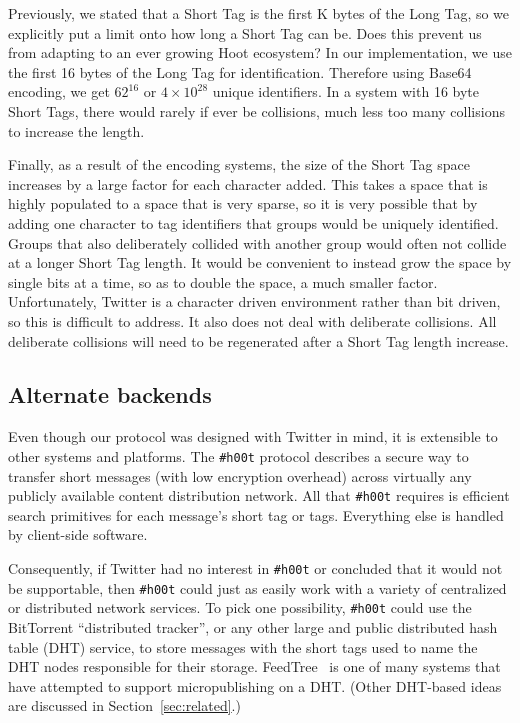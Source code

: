 \documentclass{sig-alternate-arxiv}
\newcommand{\hoot}{{\tt \#h00t}\xspace}
\begin{document}
Previously, we stated that a Short Tag is the first K bytes of the Long Tag, so we explicitly put a limit onto how long a Short Tag can be. Does this prevent us from adapting to an ever growing Hoot ecosystem? In our implementation, we use the first 16 bytes of the Long Tag for identification. Therefore using Base64 encoding, we get $62^{16}$ or $4\times10^{28}$ unique identifiers. In a system with 16 byte Short Tags, there would rarely if ever be collisions, much less too many collisions to increase the length.

Finally, as a result of the encoding systems, the size of the Short Tag space increases by a large factor for each character added. This takes a space that is highly populated to a space that is very sparse, so it is very possible that by adding one character to tag identifiers that groups would be uniquely identified. Groups that also deliberately collided with another group would often not collide at a longer Short Tag length. It would be convenient to instead grow the space by single bits at a time, so as to double the space, a much smaller factor. Unfortunately, Twitter is a character driven environment rather than bit driven, so this is difficult to address. It also does not deal with deliberate collisions. All deliberate collisions will need to be regenerated after a Short Tag length increase.
\fi



\subsection{Alternate backends}
\label{sec:dht}

Even though our protocol was designed with Twitter in mind, it is extensible to other systems and platforms. The \hoot protocol describes a secure way to transfer short messages (with low encryption overhead) across virtually any publicly available content distribution network. All that \hoot requires is efficient search primitives for each message's short tag or tags. Everything else is handled by client-side software.

Consequently, if Twitter had no interest in \hoot or concluded that it would not be supportable, then \hoot could just as easily work with a variety of centralized or distributed network services. To pick one possibility, \hoot could use the BitTorrent ``distributed tracker'', or any other large and public distributed hash table (DHT) service, to store messages with the short tags used to name the DHT nodes responsible for their storage. FeedTree~\cite{sandler05feedtree} is one of many systems that have attempted to support micropublishing on a DHT. (Other DHT-based ideas are discussed in Section~\ref{sec:related}.) 
\end{document}
